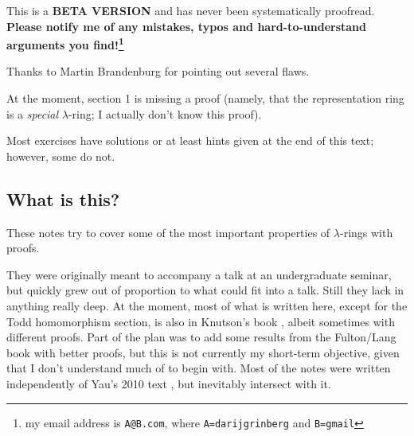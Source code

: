 \documentclass[numbers=enddot,12pt,final,onecolumn,notitlepage]{scrartcl}%
\begin{document}
\title{}
\author{Darij Grinberg}
\date{Version 0.0.18, last revised
\today
}
\maketitle
\tableofcontents



\bigskip

This is a \textbf{BETA VERSION} and has never been systematically proofread.
\textbf{Please notify me of any mistakes, typos and hard-to-understand
arguments you find!\footnote{my email address is \texttt{A@B.com}, where
\texttt{A=darijgrinberg} and \texttt{B=gmail}}}

Thanks to Martin Brandenburg for pointing out several flaws.

At the moment, section 1 is missing a proof (namely, that the representation
ring is a \textit{special} $\lambda$-ring; I actually don't know this proof).

Most exercises have solutions or at least hints given at the end of this text;
however, some do not.

\bigskip

\subsection*{What is this?}

These notes try to cover some of the most important properties of $\lambda
$-rings with proofs.

They were originally meant to accompany a talk at an undergraduate seminar,
but quickly grew out of proportion to what could fit into a talk. Still they
lack in anything really deep. At the moment, most of what is written here,
except for the Todd homomorphism section, is also in Knutson's book
\cite{Knut73}, albeit sometimes with different proofs. Part of the plan was to
add some results from the Fulton/Lang book \cite{FulLan85} with better proofs,
but this is not currently my short-term objective, given that I don't
understand much of \cite{FulLan85} to begin with. Most of the notes were
written independently of Yau's 2010 text \cite{Yau10}, but inevitably
intersect with it.
\end{document}
